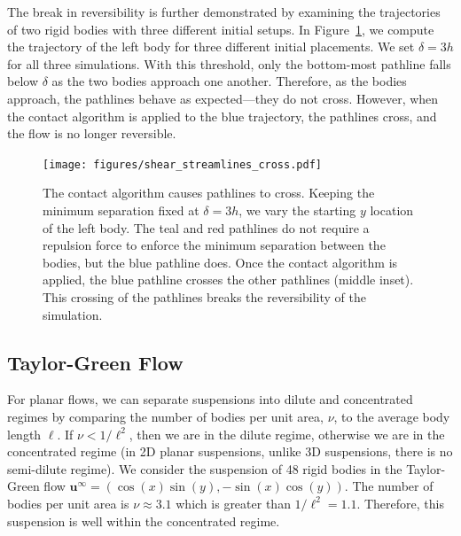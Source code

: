 \documentclass[AMA,STIX1COL]{WileyNJD-v2}
\begin{document}
The break in reversibility is further demonstrated by examining
the trajectories of two rigid bodies with three different initial
setups.  In Figure~\ref{fig:shear_cross}, we compute the
trajectory of the left body for three different initial placements.  We
set $\delta=3h$ for all three simulations.  With this threshold, only
the bottom-most pathline falls below $\delta$ as the two bodies approach
one another.  Therefore, as the bodies approach, the pathlines behave as
expected---they do not cross.  However, when the contact algorithm is
applied to the blue trajectory, the pathlines cross, and the flow is no
longer reversible.

\begin{figure}[t]
\centerline{\texttt{[image: figures/shear\_streamlines\_cross.pdf]}}
\caption{\label{fig:shear_cross} The contact algorithm causes pathlines
to cross. Keeping the minimum separation fixed at $\delta=3h$, we vary
the starting $y$ location of the left body. The teal and red pathlines
do not require a repulsion force to enforce the minimum separation
between the bodies, but the blue pathline does.  Once the contact
algorithm is applied, the blue pathline crosses the other pathlines
(middle inset). This crossing of the pathlines breaks the reversibility
of the simulation.}
\end{figure}


\subsection{Taylor-Green Flow}\label{sec:taylor_green}

For planar flows, we can separate suspensions into dilute and
concentrated regimes by comparing the number of bodies per unit area,
$\nu$, to the average body length $\ell$. If $\nu < 1/\ell^2$, then we
are in the dilute regime, otherwise we are in the concentrated regime
(in 2D planar suspensions, unlike 3D suspensions, there is no
semi-dilute regime).  We consider the suspension of 48 rigid bodies in
the Taylor-Green flow $\mathbf{u}^\infty = (\cos(x)\sin(y),
-\sin(x)\cos(y))$.  The number of bodies per unit area is $\nu \approx
3.1$ which is greater than $1/\ell^2=1.1$.  Therefore, this suspension
is well within the concentrated regime. 
\end{document}
